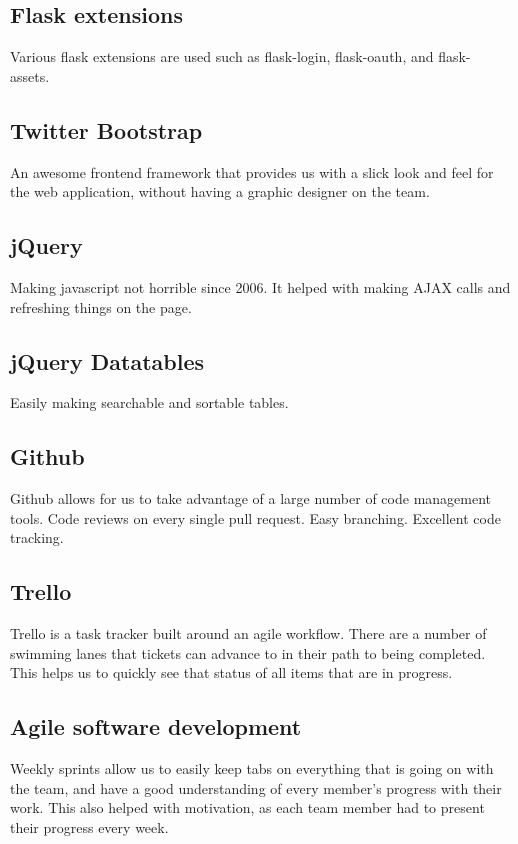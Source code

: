 \documentclass{article}
\begin{document}
\subsection{Flask extensions}
Various flask extensions are used such as flask-login, flask-oauth, and flask- assets.

\subsection{Twitter Bootstrap}
An awesome frontend framework that provides us with a slick look and feel for the web application, without having a graphic designer on the team.

\subsection{jQuery}
Making javascript not horrible since 2006. It helped with making AJAX calls and refreshing things on the page.

\subsection{jQuery Datatables}
Easily making searchable and sortable tables.

\subsection{Github}
Github allows for us to take advantage of a large number of code management tools.  Code reviews on every single pull request.  Easy branching.  Excellent code tracking. 

\subsection{Trello}
Trello is a task tracker built around an agile workflow.  There are a number of swimming lanes that tickets can advance to in their path to being completed.  This helps us to quickly see that status of all items that are in progress. 

\subsection{Agile software development}
Weekly sprints allow us to easily keep tabs on everything that is going on with the team, and have a good understanding of every member's progress with their work.  This also helped with motivation, as each team member had to present their progress every week.
\end{document}
